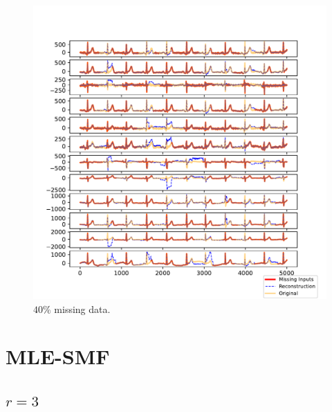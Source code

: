 \documentclass{mldsmsc}
\begin{document}
\begin{figure}[H]
\vspace{1em} %

\begin{minipage}{0.4\linewidth}
    \centering
    \includegraphics[width=\linewidth]{images/missing/rpsmf_output_40_10.pdf}
    \caption{$40\%$ missing data.}
\end{minipage}
\end{figure}

\section{MLE-SMF}\label{app:mle-smf}

\subsection{$r = 3$}
\end{document}
